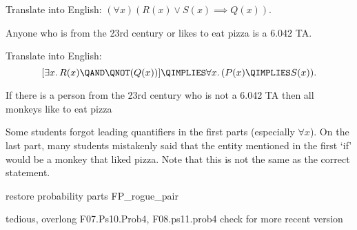\begin{problem}
\begin{problemparts}
\ppart Translate into English: $(\forall x) (R(x) \vee S(x) \implies
Q(x))$.

\begin{solution}
Anyone who is from the 23rd century or  likes to eat pizza is a 6.042 TA.
\end{solution}

\ppart Translate into English:
\[
[\exists x.\, R(x) \QAND \QNOT(Q(x))]
\QIMPLIES \forall x.\,(P(x) \QIMPLIES S(x)).
\]

\begin{solution}
If there is a person from the 23rd century who is not a 6.042 TA then all monkeys like to eat pizza
\end{solution}

\begin{solution}
Some students forgot leading quantifiers in the first parts (especially
$\forall x$). On the last part, many students mistakenly said that
the entity mentioned in the first `if' would be a monkey that liked
pizza. Note that this is not the same as the correct statement.
\end{solution}

\end{problemparts}
\end{problem}

\begin{problem}
restore probability parts FP_rogue_pair
\end{problem}

\begin{staffnotes}
tedious, overlong
F07.Ps10.Prob4, F08.ps11.prob4
check for more recent version
\end{staffnotes}

